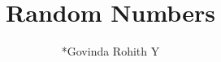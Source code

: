 \documentclass[journal,12pt,twocolumn]{IEEEtran}
\renewcommand\thesection{\arabic{section}}
\begin{document}
\newcommand{\mydet}[1]{\ensuremath{\begin{vmatrix}#1\end{vmatrix}}}
\providecommand{\dec}[2]{\ensuremath{\overset{#1}{\underset{#2}{\gtrless}}}}
\DeclarePairedDelimiter{\ceil}{\lceil}{\rceil}
\makeatletter
{}
\makeatother
\let\StandardTheFigure\thefigure
\renewcommand{\thefigure}{\thesection}
\makeatletter
{}
\makeatother
\let\StandardTheFigure\thefigure
\let\StandardTheTable\thetable
\let\vec\mathbf
{}
\vspace{3cm}
\title{%
	{
	Random Numbers
	}
}
%
%
%
\author{ *Govinda Rohith Y}
% 
%
\end{document}
